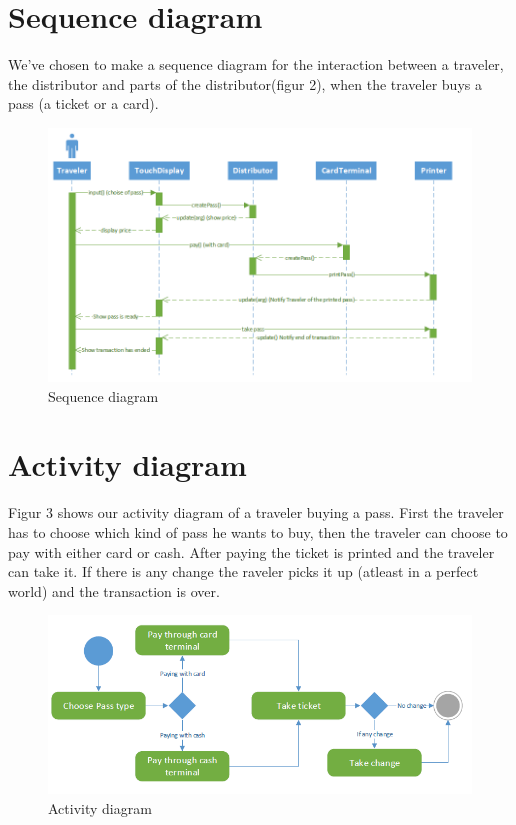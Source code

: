 \documentclass[pdftex,12pt,a4paper]{article}
\begin{document}
\pagebreak

\section{Sequence diagram}
We've chosen to make a sequence diagram for the  interaction between a traveler, the distributor and parts of the distributor(figur 2), when the traveler buys a pass (a ticket or a card).
\begin{figure}[h]
\centering
\includegraphics[scale = 0.7]{sequence.png}
\caption{Sequence diagram}
\end{figure}

\pagebreak

\section{Activity diagram}
Figur 3 shows our activity diagram of a traveler buying a pass. First the traveler has to choose which kind of pass he wants to buy, then the traveler can choose to pay with either card or cash. After paying the ticket is printed and the traveler can take it. If there is any change the raveler picks it up (atleast in a perfect world) and the transaction is over.
\begin{figure}[h]
\centering
\includegraphics[scale = 0.8]{activity.png}
\caption{Activity diagram}
\end{figure}
\end{document}
